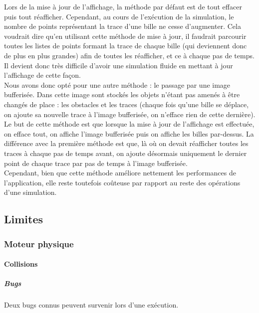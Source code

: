 \documentclass{report}
\begin{document}
Lors de la mise à jour de l’affichage, la méthode par défaut est de tout effacer puis tout réafficher. Cependant, au cours de l’exécution de la simulation, le nombre de points représentant la trace d’une bille ne cesse d’augmenter. Cela voudrait dire qu’en utilisant cette méthode de mise à jour, il faudrait parcourir toutes les listes de points formant la trace de chaque bille (qui deviennent donc de plus en plus grandes) afin de toutes les réafficher, et ce à chaque pas de temps. Il devient donc très difficile d’avoir une simulation fluide en mettant à jour l’affichage de cette façon. \\

Nous avons donc opté pour une autre méthode : le passage par une image bufferisée. Dans cette image sont stockés les objets n’étant pas amenés à être changés de place : les obstacles et les traces (chaque fois qu’une bille se déplace, on ajoute sa nouvelle trace à l’image bufferisée, on n’efface rien de cette dernière). \\

Le but de cette méthode est que lorsque la mise à jour de l’affichage est effectuée, on efface tout, on affiche l’image bufferisée puis on affiche les billes par-dessus. La différence avec la première méthode est que, là où on devait réafficher toutes les traces à chaque pas de temps avant, on ajoute désormais uniquement le dernier point de chaque trace par pas de temps à l’image bufferisée. \\

Cependant, bien que cette méthode améliore nettement les performances de l’application, elle reste toutefois coûteuse par rapport au reste des opérations d’une simulation.

\newpage
\subsection{Limites}

\subsubsection{Moteur physique}

\paragraph{Collisions}

\subparagraph{Bugs}

Deux bugs connus peuvent survenir lors d’une exécution. \\
\end{document}
